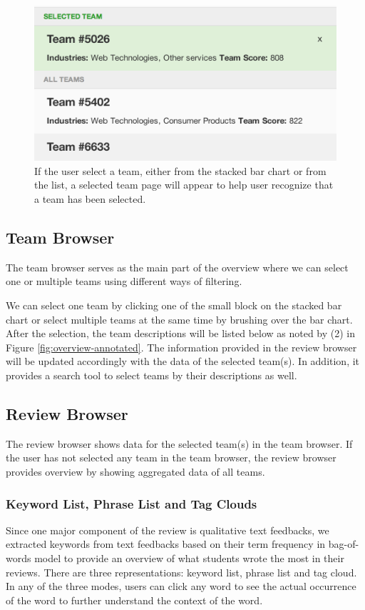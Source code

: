 \documentclass{sigchi}
\begin{document}
\begin{figure}[]
\centering
\includegraphics[width=.8\columnwidth]{images/selected-team}
\vspace{2.00mm}
\caption{If the user select a team, either from the stacked bar chart or from the list,
a selected team page will appear to help user recognize that a team has been selected.}
\label{fig:selected-team}

\end{figure}

\subsection{Team Browser}
The team browser serves as the main part of the overview
where we can select one or multiple teams using different ways of filtering.

We can select one team by clicking one of the small block on the stacked bar
chart or select multiple teams at the same time by brushing over the bar chart.
After the selection, the team descriptions will be listed below as noted by (2)
in Figure \ref{fig:overview-annotated}. The information provided in the review
browser will be updated accordingly with the data of the selected team(s). In
addition, it provides a search tool to select teams by their descriptions as
well.



\subsection{Review Browser}
The review browser shows data for the selected team(s) in the team browser. If
the user has not selected any team in the team browser, the review browser
provides overview by showing aggregated data of all teams.

\subsubsection{Keyword List, Phrase List and Tag Clouds}
Since one major
component of the review is qualitative text feedbacks, we extracted keywords
from text feedbacks based on their term frequency in bag-of- words model \cite
{bag-of-words} to provide an overview of what students wrote the most in their
reviews. There are three representations: keyword list, phrase list and tag
cloud. In any of the three modes, users can click any word to see the actual
occurrence of the word to further understand the context of the word.
\end{document}
